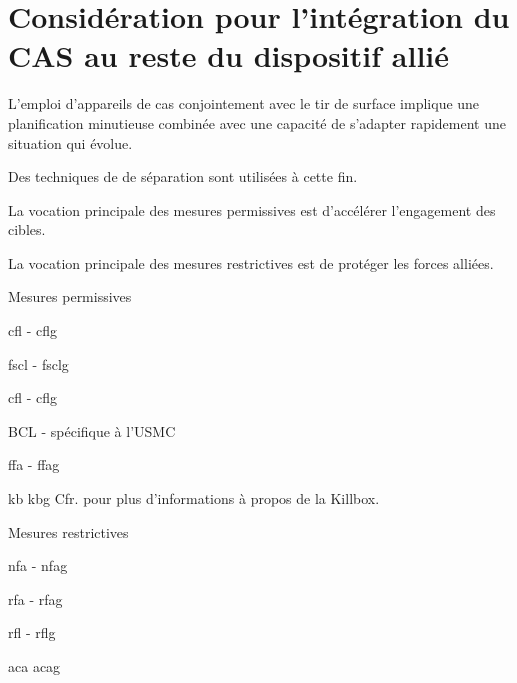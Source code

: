 \section{Considération pour l'intégration du CAS au reste du dispositif allié}

L'emploi d'appareils de \gls{cas} conjointement avec le tir de surface implique une planification minutieuse combinée avec une capacité de s'adapter rapidement une situation qui évolue.

Des techniques de de séparation sont utilisées à cette fin.

\begin{e1}
	\item La vocation principale des mesures permissives est d'accélérer l'engagement des cibles.
	\item La vocation principale des mesures restrictives est de protéger les forces alliées.
	\begin{e2}
		\item Mesures permissives
		\begin{e3}
			\item {} \gls{cfl} - \glsdesc{cflg}
			\item {} \gls{fscl} - \glsdesc{fsclg}
			\item {} \gls{cfl} - \glsdesc{cflg}
			\item BCL - spécifique à l'USMC
			\item {} \gls{ffa} - \glsdesc{ffag}
			\item {} \gls{kb}\eskip{} \glsdesc{kbg}\eskip{} Cfr.  pour plus d'informations à propos de la Killbox.
		\end{e3}
		\item Mesures restrictives
		\begin{e3}
			\item {} \gls{nfa} - \glsdesc{nfag}
			\item {} \gls{rfa} - \glsdesc{rfag}
			\item {} \gls{rfl} - \glsdesc{rflg}
			\item {} \gls{aca}\eskip{} \glsdesc{acag}

\end{e3}
\end{e2}
\end{e1}
